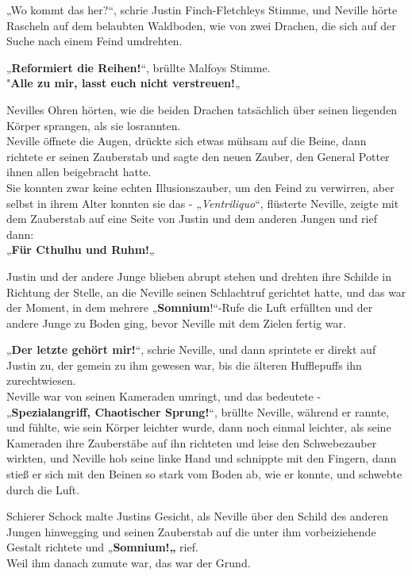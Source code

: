 {„Wo kommt das her?“, schrie Justin Finch-Fletchleys Stimme, und Neville hörte Rascheln auf dem belaubten Waldboden, wie von zwei Drachen, die sich auf der Suche nach einem Feind umdrehten.

„\textbf{Reformiert die Reihen!}“, brüllte Malfoys Stimme.\\ "\textbf{Alle zu mir, lasst euch nicht verstreuen!}„

Nevilles Ohren hörten, wie die beiden Drachen tatsächlich über seinen liegenden Körper sprangen, als sie losrannten.\\ Neville öffnete die Augen, drückte sich etwas mühsam auf die Beine, dann richtete er seinen Zauberstab und sagte den neuen Zauber, den General Potter ihnen allen beigebracht hatte.\\ Sie konnten zwar keine echten Illusionszauber, um den Feind zu verwirren, aber selbst in ihrem Alter konnten sie das - „\emph{Ventriliquo}“, flüsterte Neville, zeigte mit dem Zauberstab auf eine Seite von Justin und dem anderen Jungen und rief dann:\\ „\textbf{Für Cthulhu und Ruhm!}„

Justin und der andere Junge blieben abrupt stehen und drehten ihre Schilde in Richtung der Stelle, an die Neville seinen Schlachtruf gerichtet hatte, und das war der Moment, in dem mehrere „\textbf{Somnium}!“-Rufe die Luft erfüllten und der andere Junge zu Boden ging, bevor Neville mit dem Zielen fertig war.

„\textbf{Der letzte gehört mir!}“, schrie Neville, und dann sprintete er direkt auf Justin zu, der gemein zu ihm gewesen war, bis die älteren Hufflepuffs ihn zurechtwiesen.\\ Neville war von seinen Kameraden umringt, und das bedeutete -\\ „\textbf{Spezialangriff, Chaotischer Sprung!}“, brüllte Neville, während er rannte, und fühlte, wie sein Körper leichter wurde, dann noch einmal leichter, als seine Kameraden ihre Zauberstäbe auf ihn richteten und leise den Schwebezauber wirkten, und Neville hob seine linke Hand und schnippte mit den Fingern, dann stieß er sich mit den Beinen so stark vom Boden ab, wie er konnte, und schwebte durch die Luft.

Schierer Schock malte Justins Gesicht, als Neville über den Schild des anderen Jungen hinwegging und seinen Zauberstab auf die unter ihm vorbeiziehende Gestalt richtete und „\textbf{Somnium!„} rief.\\ Weil ihm danach zumute war, das war der Grund.

}
